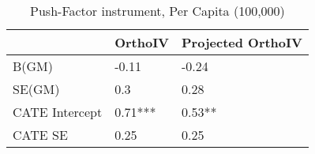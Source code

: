 \begin{table}\centering\caption{Push-Factor instrument, Per Capita (100,000)}\begin{tabular}{lll}
\toprule
                & OrthoIV   & Projected OrthoIV   \\
\midrule
 B(GM)          & -0.11     & -0.24               \\
 SE(GM)         & 0.3       & 0.28                \\
 CATE Intercept & 0.71***   & 0.53**              \\
 CATE SE        & 0.25      & 0.25                \\
\bottomrule
\end{tabular}\end{table}